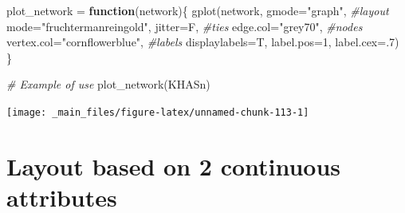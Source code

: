 \documentclass[
  notitlepage,
  onecolumn,
  openany]{book}
\newenvironment{Shaded}{\begin{snugshade}}{\end{snugshade}}
\newcommand{\AttributeTok}[1]{\textcolor[rgb]{0.77,0.63,0.00}{#1}}
\newcommand{\CommentTok}[1]{\textcolor[rgb]{0.56,0.35,0.01}{\textit{#1}}}
\newcommand{\ControlFlowTok}[1]{\textcolor[rgb]{0.13,0.29,0.53}{\textbf{#1}}}
\newcommand{\DecValTok}[1]{\textcolor[rgb]{0.00,0.00,0.81}{#1}}
\newcommand{\FunctionTok}[1]{\textcolor[rgb]{0.00,0.00,0.00}{#1}}
\newcommand{\NormalTok}[1]{#1}
\newcommand{\OtherTok}[1]{\textcolor[rgb]{0.56,0.35,0.01}{#1}}
\newcommand{\StringTok}[1]{\textcolor[rgb]{0.31,0.60,0.02}{#1}}
\begin{document}
\begin{Shaded}
\begin{Highlighting}[]
\NormalTok{plot\_network }\OtherTok{=} \ControlFlowTok{function}\NormalTok{(network)\{}
    \FunctionTok{gplot}\NormalTok{(network, }
      \AttributeTok{gmode=}\StringTok{"graph"}\NormalTok{,}
      \CommentTok{\#layout}
      \AttributeTok{mode=}\StringTok{"fruchtermanreingold"}\NormalTok{,}
      \AttributeTok{jitter=}\NormalTok{F,}
      \CommentTok{\#ties}
      \AttributeTok{edge.col=}\StringTok{"grey70"}\NormalTok{,}
      \CommentTok{\#nodes}
      \AttributeTok{vertex.col=}\StringTok{"cornflowerblue"}\NormalTok{,}
      \CommentTok{\#labels}
      \AttributeTok{displaylabels=}\NormalTok{T,}
      \AttributeTok{label.pos=}\DecValTok{1}\NormalTok{,}
      \AttributeTok{label.cex=}\NormalTok{.}\DecValTok{7}\NormalTok{)}
\NormalTok{\}}

\CommentTok{\# Example of use}
\FunctionTok{plot\_network}\NormalTok{(KHASn)}
\end{Highlighting}
\end{Shaded}

\begin{center}\texttt{[image: \_main\_files/figure-latex/unnamed-chunk-113-1]} \end{center}

\hypertarget{layout-based-on-2-continuous-attributes}{%
\section{Layout based on 2 continuous attributes}\label{layout-based-on-2-continuous-attributes}}
\end{document}
